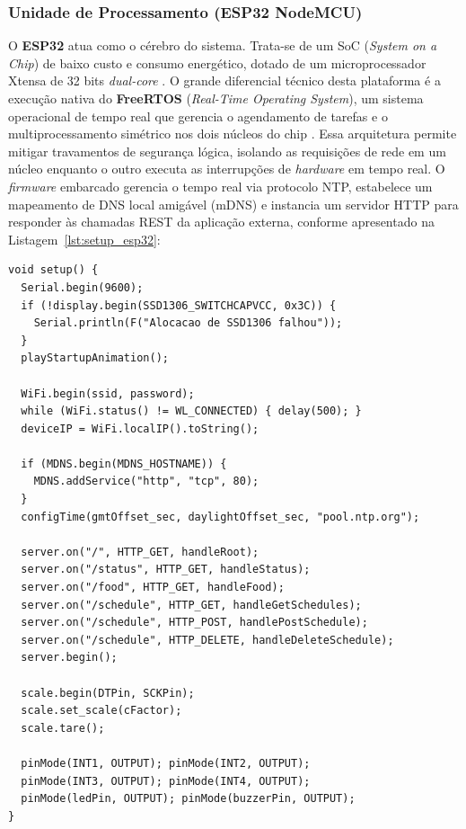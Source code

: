 \documentclass[12pt]{article}\usepackage{sbc-template}\usepackage{graphicx,url}\usepackage[utf8]{inputenc}
\begin{document}
\subsubsection{Unidade de Processamento (ESP32 NodeMCU)}
O \textbf{ESP32} atua como o cérebro do sistema. Trata-se de um SoC (\textit{System on a Chip}) de baixo custo e consumo energético, dotado de um microprocessador Xtensa de 32 bits \textit{dual-core} \cite{espressif:esp32}. O grande diferencial técnico desta plataforma é a execução nativa do \textbf{FreeRTOS} (\textit{Real-Time Operating System}), um sistema operacional de tempo real que gerencia o agendamento de tarefas e o multiprocessamento simétrico nos dois núcleos do chip \cite{gay:18}. Essa arquitetura permite mitigar travamentos de segurança lógica, isolando as requisições de rede em um núcleo enquanto o outro executa as interrupções de \textit{hardware} em tempo real. O \textit{firmware} embarcado gerencia o tempo real via protocolo NTP, estabelece um mapeamento de DNS local amigável (mDNS) e instancia um servidor HTTP para responder às chamadas REST da aplicação externa, conforme apresentado na Listagem~\ref{lst:setup_esp32}:

\begin{lstlisting}[caption={Configuração inicial assíncrona, rotas do servidor HTTP e periféricos no ESP32.}, label={lst:setup_esp32}]
void setup() {
  Serial.begin(9600);
  if (!display.begin(SSD1306_SWITCHCAPVCC, 0x3C)) {
    Serial.println(F("Alocacao de SSD1306 falhou"));
  }
  playStartupAnimation();
  
  WiFi.begin(ssid, password);
  while (WiFi.status() != WL_CONNECTED) { delay(500); }
  deviceIP = WiFi.localIP().toString();
  
  if (MDNS.begin(MDNS_HOSTNAME)) {
    MDNS.addService("http", "tcp", 80);
  }
  configTime(gmtOffset_sec, daylightOffset_sec, "pool.ntp.org");
  
  server.on("/", HTTP_GET, handleRoot);
  server.on("/status", HTTP_GET, handleStatus);
  server.on("/food", HTTP_GET, handleFood);
  server.on("/schedule", HTTP_GET, handleGetSchedules);
  server.on("/schedule", HTTP_POST, handlePostSchedule);
  server.on("/schedule", HTTP_DELETE, handleDeleteSchedule);
  server.begin();
  
  scale.begin(DTPin, SCKPin);
  scale.set_scale(cFactor);
  scale.tare();
  
  pinMode(INT1, OUTPUT); pinMode(INT2, OUTPUT);
  pinMode(INT3, OUTPUT); pinMode(INT4, OUTPUT);
  pinMode(ledPin, OUTPUT); pinMode(buzzerPin, OUTPUT);
}
\end{lstlisting}
\end{document}

